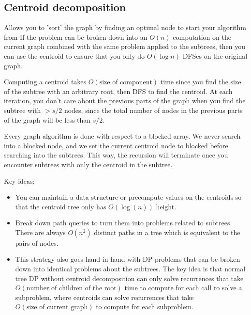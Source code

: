 \documentclass[12pt]{article}
\begin{document}
\subsection{Centroid decomposition}
Allows you to 'sort' the graph by finding an optimal node to start your algorithm from
If the problem can be broken down into an $O(n)$ computation on the current graph combined
with the same problem applied to the subtrees, then you can use the centroid to ensure that
you only do $O(\log n)$ DFSes on the original graph.

Computing a centroid takes $O(\text{size of component})$ time since
you find the size of the subtree with an arbitrary root, then DFS to find the centroid.
At each iteration, you don't care about the previous parts of the graph when you find the
subtree with $> s/2$ nodes,
since the total number of nodes in the previous parts of the graph will be less than $s/2$.

Every graph algorithm is done with respect to a blocked array. We never search into a blocked node,
and we set the current centroid node to blocked before searching into the subtrees.
This way, the recursion will terminate once you encounter subtrees with only the centroid in the subtree.

Key ideas:

\begin{itemize}
    \item
          You can maintain a data structure or precompute values
          on the centroids so that the centroid tree only has $O(\log(n))$ height.

    \item Break down path queries to turn them into problems related to subtrees. There are always $O(n^2)$ distinct paths
          in a tree which is equivalent to the pairs of nodes.

    \item This strategy also goes hand-in-hand with DP problems that can be broken down into identical problems about the
          subtrees. The key idea is that normal tree DP without centroid decomposition can only solve recurrences that
          take $O(\text{number of children of the root})$ time to compute for each call to solve
          a subproblem, where centroids can solve recurrences that take
          $O(\text{size of current graph})$ to compute for each subproblem.
\end{itemize}
\end{document}
